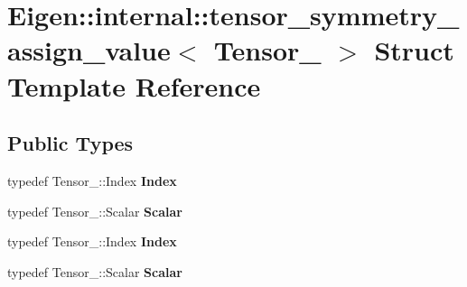 \hypertarget{struct_eigen_1_1internal_1_1tensor__symmetry__assign__value}{}\section{Eigen\+:\+:internal\+:\+:tensor\+\_\+symmetry\+\_\+assign\+\_\+value$<$ Tensor\+\_\+ $>$ Struct Template Reference}
\label{struct_eigen_1_1internal_1_1tensor__symmetry__assign__value}
\subsection*{Public Types}
\begin{DoxyCompactItemize}
\item 
\mbox{\label{struct_eigen_1_1internal_1_1tensor__symmetry__assign__value_abb95c35dd747bc4bb571a194db6810ba}} 
typedef Tensor\+\_\+\+::\+Index {\bfseries Index}
\item 
\mbox{\label{struct_eigen_1_1internal_1_1tensor__symmetry__assign__value_a4b6e7906d81215e5624ca25796ee8b38}} 
typedef Tensor\+\_\+\+::\+Scalar {\bfseries Scalar}
\item 
\mbox{\label{struct_eigen_1_1internal_1_1tensor__symmetry__assign__value_abb95c35dd747bc4bb571a194db6810ba}} 
typedef Tensor\+\_\+\+::\+Index {\bfseries Index}
\item 
\mbox{\label{struct_eigen_1_1internal_1_1tensor__symmetry__assign__value_a4b6e7906d81215e5624ca25796ee8b38}} 
typedef Tensor\+\_\+\+::\+Scalar {\bfseries Scalar}
\end{DoxyCompactItemize}
